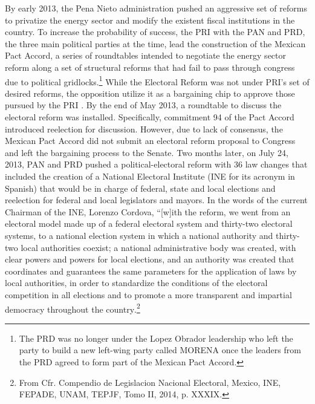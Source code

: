 \begin{appendix}
By early 2013, the Pena Nieto administration pushed an aggressive set of reforms to privatize the energy sector and modify the existent fiscal institutions in the country. To increase the probability of success, the PRI with the PAN and PRD, the three main political parties at the time, lead the construction of the Mexican Pact Accord, a series of roundtables intended to negotiate the energy sector reform along a set of structural reforms that had fail to pass through congress due to political gridlocks.\footnote{The PRD was no longer under the Lopez Obrador leadership who left the party to build a new left-wing party called MORENA once the leaders from the PRD agreed to form part of the Mexican Pact Accord.} While the Electoral Reform was not under PRI's set of desired reforms, the opposition utilize it as a bargaining chip to approve those pursued by the PRI \citep{zamitiz_2017}. By the end of May 2013, a roundtable to discuss the electoral reform was installed. Specifically, commitment 94 of the Pact Accord introduced reelection for discussion. However, due to lack of consensus, the Mexican Pact Accord did not submit an electoral reform proposal to Congress and left the bargaining process to the Senate. Two months later, on July 24, 2013, PAN and PRD pushed a political-electoral reform with 36 law changes that included  the creation of a National Electoral Institute (INE for its acronym in Spanish) that would be in charge of federal, state and local elections and reelection for federal and local legislators and mayors. In the words of the current Chairman of the INE, Lorenzo Cordova, ``[w]ith the reform, we went from an electoral model made up of a federal electoral system and thirty-two electoral systems, to a national election system in which a national authority and thirty-two local authorities coexist; a national administrative body was created, with clear powers and powers for local elections, and an authority was created that coordinates and guarantees the same parameters for the application of laws by local authorities, in order to standardize the conditions of the electoral competition in all elections and to promote a more transparent and impartial democracy throughout the country.\footnote{From Cfr. Compendio de Legislacion Nacional Electoral, Mexico, INE, FEPADE, UNAM, TEPJF, Tomo II, 2014, p. XXXIX.} 



\end{appendix}
